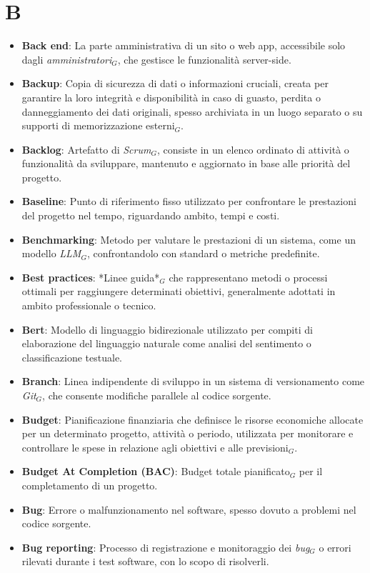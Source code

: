 \section{B}
\begin{itemize}
    \item \textbf{Back end}: La parte amministrativa di un sito o web app, accessibile solo dagli \textit{amministratori}$_G$, che gestisce le funzionalità server-side.
    \item \textbf{Backup}: Copia di sicurezza di dati o informazioni cruciali, creata per garantire la loro integrità e disponibilità in caso di guasto, perdita o danneggiamento dei dati originali, spesso archiviata in un luogo separato o su supporti di memorizzazione esterni$_G$.
    \item \textbf{Backlog}: Artefatto di \textit{Scrum}$_G$, consiste in un elenco ordinato di attività o funzionalità da sviluppare, mantenuto e aggiornato in base alle priorità del progetto.
    \item \textbf{Baseline}: Punto di riferimento fisso utilizzato per confrontare le prestazioni del progetto nel tempo, riguardando ambito, tempi e costi.
    \item \textbf{Benchmarking}: Metodo per valutare le prestazioni di un sistema, come un modello \textit{LLM}$_G$, confrontandolo con standard o metriche predefinite.
    \item \textbf{Best practices}: *Linee guida*$_G$ che rappresentano metodi o processi ottimali per raggiungere determinati obiettivi, generalmente adottati in ambito professionale o tecnico.
    \item \textbf{Bert}: Modello di linguaggio bidirezionale utilizzato per compiti di elaborazione del linguaggio naturale come analisi del sentimento o classificazione testuale.
    \item \textbf{Branch}: Linea indipendente di sviluppo in un sistema di versionamento come \textit{Git}$_G$, che consente modifiche parallele al codice sorgente.
    \item \textbf{Budget}: Pianificazione finanziaria che definisce le risorse economiche allocate per un determinato progetto, attività o periodo, utilizzata per monitorare e controllare le spese in relazione agli obiettivi e alle previsioni$_G$.
    \item \textbf{Budget At Completion (BAC)}: Budget totale pianificato$_G$ per il completamento di un progetto.
    \item \textbf{Bug}: Errore o malfunzionamento nel software, spesso dovuto a problemi nel codice sorgente.
    \item \textbf{Bug reporting}: Processo di registrazione e monitoraggio dei \textit{bug}$_G$ o errori rilevati durante i test software, con lo scopo di risolverli.
\end{itemize}
